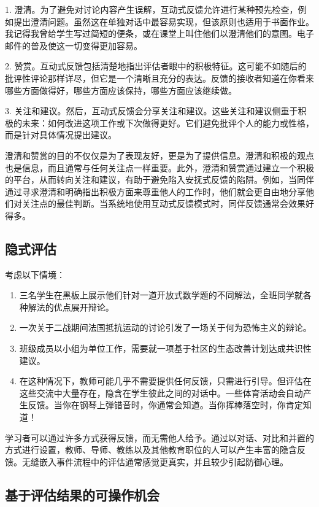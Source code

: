 1.	澄清。为了避免对讨论内容产生误解，互动式反馈允许进行某种预先检查，例如提出澄清问题。虽然这在单独对话中最容易实现，但该原则也适用于书面作业。我记得我曾给学生写过简短的便条，或在课堂上叫住他们以澄清他们的意图。电子邮件的普及使这一切变得更加容易。

2.	赞赏。互动式反馈包括清楚地指出评估者眼中的积极特征。这可能不如随后的批评性评论那样详尽，但它是一个清晰且充分的表达。反馈的接收者知道在你看来哪些方面做得好，哪些方面应该保持，哪些方面应该继续做。

3.	关注和建议。然后，互动式反馈会分享关注和建议。这些关注和建议侧重于积极的未来：如何改进这项工作或下次做得更好。它们避免批评个人的能力或性格，而是针对具体情况提出建议。

澄清和赞赏的目的不仅仅是为了表现友好，更是为了提供信息。澄清和积极的观点也是信息，而且通常与任何关注点一样重要。此外，澄清和赞赏通过建立一个积极的平台，从而转向关注和建议，有助于避免陷入安抚式反馈的陷阱。例如，当同伴通过寻求澄清和明确指出积极方面来尊重他人的工作时，他们就会更自由地分享他们对关注点的最佳判断。当系统地使用互动式反馈模式时，同伴反馈通常会效果好得多。

\subsection*{隐式评估}

考虑以下情境：
\begin{enumerate}
    \item 三名学生在黑板上展示他们针对一道开放式数学题的不同解法，全班同学就各种解法的优点展开辩论。
    \item 一次关于二战期间法国抵抗运动的讨论引发了一场关于何为恐怖主义的辩论。
    \item 班级成员以小组为单位工作，需要就一项基于社区的生态改善计划达成共识性建议。
    \item 在这种情况下，教师可能几乎不需要提供任何反馈，只需进行引导。但评估在这些交流中大量存在，隐含在学生彼此之间的对话中。一些体育活动会自动产生反馈。当你在钢琴上弹错音时，你通常会知道。当你挥棒落空时，你肯定知道！
\end{enumerate}

学习者可以通过许多方式获得反馈，而无需他人给予。通过以对话、对比和并置的方式进行设置，教师、导师、教练以及其他教育职位的人可以产生丰富的隐含反馈。无缝嵌入事件流程中的评估通常感觉更真实，并且较少引起防御心理。

\subsection*{基于评估结果的可操作机会}

